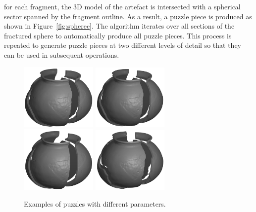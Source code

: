 \documentclass[acmlarge,screen,dvipsnames]{acmart}
\begin{document}
%
for each fragment, the 3D model of the artefact is intersected with a
spherical sector spanned by the fragment outline. As a result, a
puzzle piece is produced as shown in Figure~\ref{fig:spherec}.
%
The algorithm iterates over all sections of the fractured sphere to
automatically produce all puzzle pieces. This process is repeated to
generate puzzle pieces at two different levels of detail so that they
can be used in subsequent operations.
  
\begin{figure}[htb]    
     \centering
         {\includegraphics[width=0.33\textwidth]{images/pott1}}
        {\includegraphics[width=0.33\textwidth]{images/pott2}}
        {\includegraphics[width=0.33\textwidth]{images/pott3}}
        {\includegraphics[width=0.33\textwidth]{images/pott5}}
      \caption{\label{fig:pot-with-different-fracture-settings}%
        Examples of puzzles with different parameters.}
\end{figure}
\end{document}
